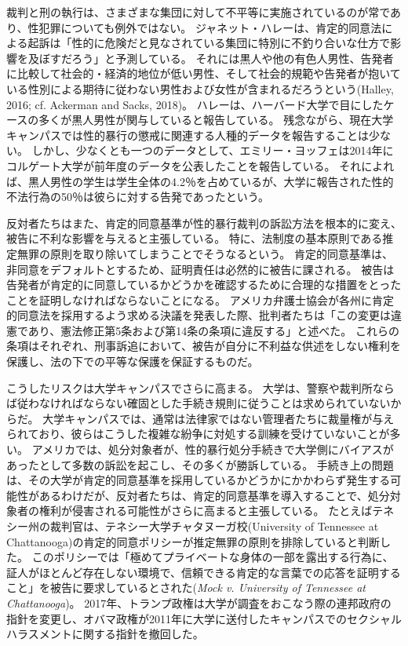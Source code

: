 \documentclass[paper=a4,book,openany]{jlreq}
\newcommand{\ig}[1]{}           %
\begin{document}
裁判と刑の執行は、さまざまな集団に対して不平等に実施されているのが常であり、性犯罪についても例外ではない。
ジャネット・ハレー\ig{Janet Halley}は、肯定的同意法による起訴は「性的に危険だと見なされている集団に特別に不釣り合いな仕方で影響を及ぼすだろう」と予測している。
それには黒人や他の有色人男性、告発者に比較して社会的・経済的地位が低い男性、そして社会的規範や告発者が抱いている性別による期待に従わない男性および女性が含まれるだろうという(Halley, 2016; cf. Ackerman and Sacks, 2018)\nocite{ackerman18:_dispr_minor_presen_u}。
ハレーは、ハーバード大学で目にしたケースの多くが黒人男性が関与していると報告している\citep[cf.][]{halley15:_tradin_megap_gavel_title_ix_enfor}。
残念ながら、現在大学キャンパスでは性的暴行の懲戒に関連する人種的データを報告することは少ない。
しかし、少なくとも一つのデータとして、エミリー・ヨッフェ\ig{Emily Yoffe}は2014年にコルゲート大学が前年度のデータを公表したことを報告している。
それによれば、黒人男性の学生は学生全体の4.2％を占めているが、大学に報告された性的不法行為の50％は彼らに対する告発であったという\citep{yoffe17:_quest_race_campus_sexual_assaul_cases}。

反対者たちはまた、肯定的同意基準が性的暴行裁判の訴訟方法を根本的に変え、被告に不利な影響を与えると主張している。
特に、法制度の基本原則である推定無罪の原則を取り除いてしまうことでそうなるという。
肯定的同意基準は、非同意をデフォルトとするため、証明責任は必然的に被告に課される。
被告は告発者が肯定的に同意しているかどうかを確認するために合理的な措置をとったことを証明しなければならないことになる。
アメリカ弁護士協会が各州に肯定的同意法を採用するよう求める決議を発表した際、批判者たちは「この変更は違憲であり、憲法修正第5条および第14条の条項に違反する」と述べた。
これらの条項はそれぞれ、刑事訴追において、被告が自分に不利益な供述をしない権利を保護し、法の下での平等な保護を保証するものだ\citep{bauer-wolf19:_lawyer_group_disag_colleg_model_affir_consen}。

こうしたリスクは大学キャンパスでさらに高まる。
大学は、警察や裁判所ならば従わなければならない確固とした手続き規則に従うことは求められていないからだ。
大学キャンパスでは、通常は法律家ではない管理者たちに裁量権が与えられており、彼らはこうした複雑な紛争に対処する訓練を受けていないことが多い。
アメリカでは、処分対象者が、性的暴行処分手続きで大学側にバイアスがあったとして多数の訴訟を起こし、その多くが勝訴している\citep{anderson19:_more_title_ix_lawsuit_accus_accus}。
手続き上の問題は、その大学が肯定的同意基準を採用しているかどうかにかかわらず発生する可能性があるわけだが、反対者たちは、肯定的同意基準を導入することで、処分対象者の権利が侵害される可能性がさらに高まると主張している。
たとえばテネシー州の裁判官は、テネシー大学チャタヌーガ校(University of Tennessee at Chattanooga)の肯定的同意ポリシーが推定無罪の原則を排除していると判断した。
このポリシーでは「極めてプライベートな身体の一部を露出する行為に、証人がほとんど存在しない環境で、信頼できる肯定的な言葉での応答を証明すること」を被告に要求しているとされた(\emph{Mock v. University of Tennessee at Chattanooga}\ig{, No. 14-1687-II, Tenn. Ch. Ct. 10 August 2015\footnote{\url{https://kcjohnson.files.wordpress.com/2013/08/memorandum-mock.pdf}.}})。
2017年、トランプ政権は大学が調査をおこなう際の連邦政府の指針を変更し、オバマ政権が2011年に大学に送付したキャンパスでのセクシャルハラスメントに関する指針を撤回した。
\end{document}
